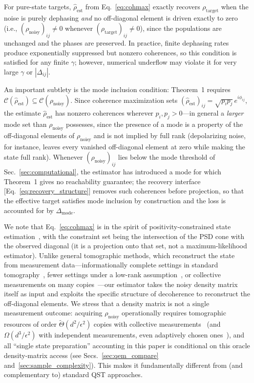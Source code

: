 \documentclass[pra,twocolumn,superscriptaddress,longbibliography,floatfix,nofootinbib]{revtex4-2}
\newcommand{\CC}{\mathcal{C}}
\newcommand{\rhot}{\rho_\mathrm{target}}
\newcommand{\rhon}{\rho_\mathrm{noisy}}
\newcommand{\rhoe}{\hat{\rho}_\mathrm{est}}
\begin{document}
For pure-state targets, $\rhoe$ from Eq.~\eqref{eq:cohmax} exactly recovers $\rhot$ when the noise is purely dephasing \emph{and} no off-diagonal element is driven exactly to zero (i.e., $(\rhon)_{ij} \neq 0$ whenever $(\rhot)_{ij} \neq 0$), since the populations are unchanged and the phases are preserved.
In practice, finite dephasing rates produce exponentially suppressed but nonzero coherences, so this condition is satisfied for any finite $\gamma$; however, numerical underflow may violate it for very large $\gamma$ or $|\Delta_{ij}|$.

An important subtlety is the mode inclusion condition: Theorem~1 requires $\CC(\rhoe) \subseteq \CC(\rhon)$.
Since coherence maximization sets $(\rhoe)_{ij} = \sqrt{p_i p_j}\,e^{i\phi_{ij}}$, the estimate $\rhoe$ has nonzero coherences wherever $p_i, p_j > 0$---in general a \emph{larger} mode set than $\rhon$ possesses, since the presence of a mode is a property of the off-diagonal elements of $\rhon$ and is not implied by full rank (depolarizing noise, for instance, leaves every vanished off-diagonal element at zero while making the state full rank).
Whenever $(\rhon)_{ij}$ lies below the mode threshold of Sec.~\ref{sec:computational}, the estimator has introduced a mode for which Theorem~1 gives no reachability guarantee; the recovery interface [Eq.~\eqref{eq:recovery_structure}] removes such coherences before projection, so that the effective target satisfies mode inclusion by construction and the loss is accounted for by $\Delta_\mathrm{mode}$.

We note that Eq.~\eqref{eq:cohmax} is in the spirit of positivity-constrained state estimation~\cite{Hradil1997}, with the constraint set being the intersection of the PSD cone with the observed diagonal (it is a projection onto that set, not a maximum-likelihood estimator).
Unlike general tomographic methods, which reconstruct the state from measurement data---informationally complete settings in standard tomography~\cite{Hradil1997}, fewer settings under a low-rank assumption~\cite{Gross2010}, or collective measurements on many copies~\cite{Haah2017}---our estimator takes the noisy density matrix itself as input and exploits the specific structure of decoherence to reconstruct the off-diagonal elements.
We stress that a density matrix is not a single measurement outcome: acquiring $\rhon$ operationally requires tomographic resources of order $\tilde\Theta(d^2/\epsilon^2)$ copies with collective measurements~\cite{Haah2017,ODonnellWright2016,Anshu2024survey} (and $\Omega(d^3/\epsilon^2)$ with independent measurements, even adaptively chosen ones~\cite{Haah2017,Chen2023adaptivity}), and all ``single state preparation'' accounting in this paper is conditional on this oracle density-matrix access (see Secs.~\ref{sec:qem_compare} and~\ref{sec:sample_complexity}).
This makes it fundamentally different from (and complementary to) standard QST approaches.
\end{document}
